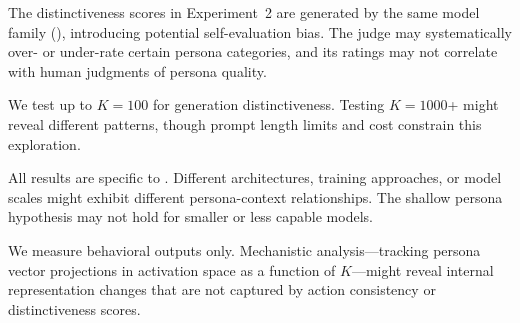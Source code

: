 The distinctiveness scores in Experiment~2 are generated by the same model family (\gptmini), introducing potential self-evaluation bias. The judge may systematically over- or under-rate certain persona categories, and its ratings may not correlate with human judgments of persona quality.

We test up to $K{=}100$ for generation distinctiveness. Testing $K{=}1000$+ might reveal different patterns, though prompt length limits and cost constrain this exploration.

All results are specific to \gptmini. Different architectures, training approaches, or model scales might exhibit different persona-context relationships. The shallow persona hypothesis may not hold for smaller or less capable models.

We measure behavioral outputs only. Mechanistic analysis---tracking persona vector projections in activation space as a function of $K$---might reveal internal representation changes that are not captured by action consistency or distinctiveness scores.
